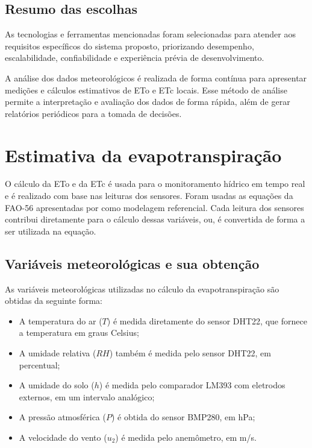 \subsection{Resumo das escolhas}
As tecnologias e ferramentas mencionadas foram selecionadas para atender aos requisitos específicos do sistema proposto, priorizando desempenho, escalabilidade, confiabilidade e experiência prévia de desenvolvimento.

A análise dos dados meteorológicos é realizada de forma contínua para apresentar medições e cálculos estimativos de ETo e ETc locais. Esse método de análise permite a interpretação e avaliação dos dados de forma rápida, além de gerar relatórios periódicos para a tomada de decisões.

\section{Estimativa da evapotranspiração}

O cálculo da ETo e da ETc é usada para o monitoramento hídrico em tempo real e é realizado com base nas leituras dos sensores. Foram usadas as equações da FAO-56 apresentadas por \textcite{Allen_evapotranspiration1998} como modelagem referencial. Cada leitura dos sensores contribui diretamente para o cálculo dessas variáveis, ou, é convertida de forma a ser utilizada na equação.

\subsection{Variáveis meteorológicas e sua obtenção}

As variáveis meteorológicas utilizadas no cálculo da evapotranspiração são obtidas da seguinte forma:
\begin{itemize}
    \item A temperatura do ar (\(T\)) é medida diretamente do sensor DHT22, que fornece a temperatura em graus Celsius;
    
    \item A umidade relativa (\(RH\)) também é medida pelo sensor DHT22, em percentual;
    
    \item A umidade do solo (\(h\)) é medida pelo comparador LM393 com eletrodos externos, em um intervalo analógico;
    
    \item A pressão atmosférica (\(P\)) é obtida do sensor BMP280, em hPa;

    \item A velocidade do vento (\(u_2\)) é medida pelo anemômetro, em m/s.
\end{itemize}

